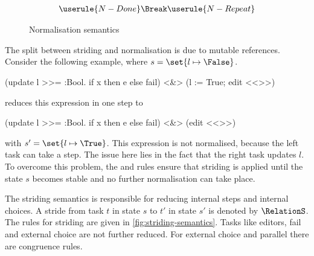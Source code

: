 \begin{figure}[h]
  \small

  \boxed{\RelationN}
  \begin{gather*}
    \userule{N-Done} \Break
    \userule{N-Repeat}
  \end{gather*}
  \caption{Normalisation semantics} \label{fig:normalisation-semantics}

\end{figure}

The split between striding and normalisation is due to mutable references.
Consider the following example, where $s=\set{l\mapsto\False}$.
\begin{TASK}
  (update l >>= \x:Bool. if x then e else fail) <&> (l := True; edit <<>>)
\end{TASK}
 reduces this expression in one step to
\begin{TASK}
  (update l >>= \x:Bool. if x then e else fail) <&> (edit <<>>)
\end{TASK}
with $s'=\set{l\mapsto\True}$.
This expression is not normalised, because the left task can take a step.
The issue here lies in the fact that the right task updates $l$.
To overcome this problem, the  and  rules ensure that striding is applied until the state $s$ becomes stable and no further normalisation can take place.

The striding semantics is responsible for reducing internal steps and internal choices.
A stride from task $t$ in state $s$ to $t'$ in state $s'$ is denoted by $\RelationS$.
The rules for striding are given in \cref{fig:striding-semantics}.
Tasks like editors, fail and external choice are not further reduced.
For external choice and parallel there are congruence rules.

